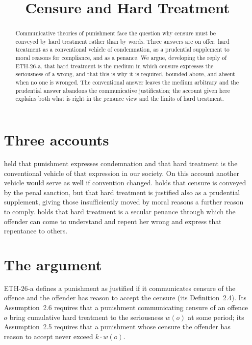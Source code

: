 \documentclass{situationist-preprint}
\title{Censure and Hard Treatment}
\begin{document}
\maketitle

\begin{abstract}
Communicative theories of punishment face the question why censure must be conveyed by hard treatment rather than by words. Three answers are on offer: hard treatment as a conventional vehicle of condemnation, as a prudential supplement to moral reasons for compliance, and as a penance. We argue, developing the reply of ETH-26-a, that hard treatment is the medium in which censure expresses the seriousness of a wrong, and that this is why it is required, bounded above, and absent when no one is wronged. The conventional answer leaves the medium arbitrary and the prudential answer abandons the communicative justification; the account given here explains both what is right in the penance view and the limits of hard treatment.
\end{abstract}

\section{Three accounts}

\citet{Feinberg1965} held that punishment expresses condemnation and that hard treatment is the conventional vehicle of that expression in our society. On this account another vehicle would serve as well if convention changed. \citet{vonHirsch1993} holds that censure is conveyed by the penal sanction, but that hard treatment is justified also as a prudential supplement, giving those insufficiently moved by moral reasons a further reason to comply. \citet{Duff2001} holds that hard treatment is a secular penance through which the offender can come to understand and repent her wrong and express that repentance to others.

\section{The argument}

ETH-26-a defines a punishment as justified if it communicates censure of the offence and the offender has reason to accept the censure (its Definition~2.4). Its Assumption~2.6 requires that a punishment communicating censure of an offence $o$ bring cumulative hard treatment to the seriousness $w(o)$ at some period; its Assumption~2.5 requires that a punishment whose censure the offender has reason to accept never exceed $k\cdot w(o)$.
\end{document}
